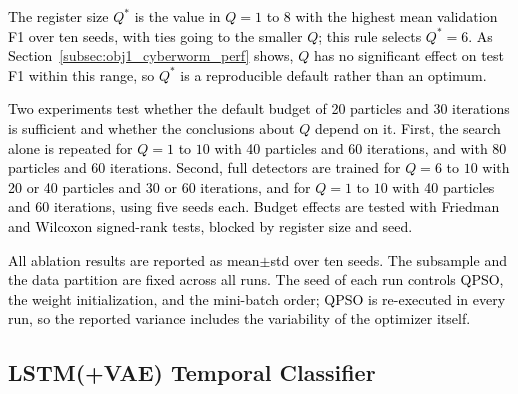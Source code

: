 \documentclass[conference]{IEEEtran}
\begin{document}
\textcolor{black}{The register size $Q^{*}$ is the value in
$Q=1$ to $8$ with the highest mean validation F1 over ten seeds, with
ties going to the smaller $Q$; this rule selects $Q^{*}=6$. As Section~\ref{subsec:obj1_cyberworm_perf}
shows, $Q$ has no significant effect on test F1 within this range, so $Q^{*}$ is a
reproducible default rather than an optimum.}

\textcolor{black}{Two experiments test whether the default
budget of 20 particles and 30 iterations is sufficient and whether
the conclusions about $Q$ depend on it. First, the search alone is
repeated for $Q=1$ to $10$ with 40 particles and 60 iterations, and
with 80 particles and 60 iterations. Second, full detectors are
trained for $Q=6$ to $10$ with 20 or 40 particles and 30 or 60
iterations, and for $Q=1$ to $10$ with 40 particles and 60
iterations, using five seeds each. Budget effects are tested with
Friedman and Wilcoxon signed-rank tests, blocked by register size
and seed.}

\textcolor{black}{All ablation results are reported as
mean$\pm$std over ten seeds. The subsample and the data partition are
fixed across all runs. The seed of each run controls QPSO, the weight
initialization, and the mini-batch order; QPSO is re-executed in
every run, so the reported variance includes the variability of the
optimizer itself.}

\subsection{LSTM(+VAE) Temporal Classifier}
\label{subsec:model_training}
\end{document}

